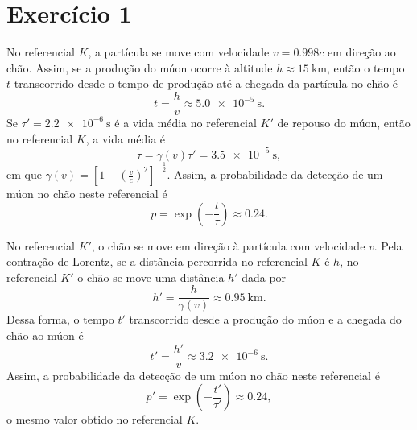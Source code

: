 \section*{Exercício 1}
No referencial \(K\), a partícula se move com velocidade \(v = 0.998c\) em direção ao chão. Assim, se a produção do múon ocorre à altitude \(h \approx \SI{15}{\kilo\meter}\), então o tempo \(t\) transcorrido desde o tempo de produção até a chegada da partícula no chão é
\begin{equation*}
    t = \frac{h}{v} \approx \SI{5.0e-5}{\second}.
\end{equation*}
Se \(\tau' = \SI{2.2e-6}{\second}\) é a vida média no referencial \(K'\) de repouso do múon, então no referencial \(K\), a vida média é
\begin{equation*}
    \tau = \gamma(v)\tau' = \SI{3.5e-5}{\second},
\end{equation*}
em que \(\gamma(v) = \left[1 - \left(\frac{v}{c}\right)^2\right]^{-\frac12}\).
Assim, a probabilidade da detecção de um múon no chão neste referencial é
\begin{equation*}
    p = \exp{\left(-\frac{t}{\tau}\right)} \approx 0.24.
\end{equation*}

No referencial \(K'\), o chão se move em direção à partícula com velocidade \(v\). Pela contração de Lorentz, se a distância percorrida no referencial \(K\) é \(h\), no referencial \(K'\) o chão se move uma distância \(h'\) dada por
\begin{equation*}
    h' = \frac{h}{\gamma(v)} \approx \SI{0.95}{\kilo\meter}.
\end{equation*}
Dessa forma, o tempo \(t'\) transcorrido desde a produção do múon e a chegada do chão ao múon é
\begin{equation*}
    t' = \frac{h'}{v} \approx \SI{3.2e-6}{\second}.
\end{equation*}
Assim, a probabilidade da detecção de um múon no chão neste referencial é
\begin{equation*}
    p' = \exp{\left(-\frac{t'}{\tau'}\right)} \approx 0.24,
\end{equation*}
o mesmo valor obtido no referencial \(K\).
